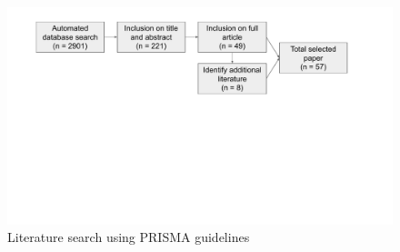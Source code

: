 
\begin{figure}[h]
  \centering
  \includegraphics[width=1\columnwidth]{figures/fig-prisma.pdf}
  \caption{Literature search using PRISMA guidelines}
  \label{fig:prisma}
\end{figure}